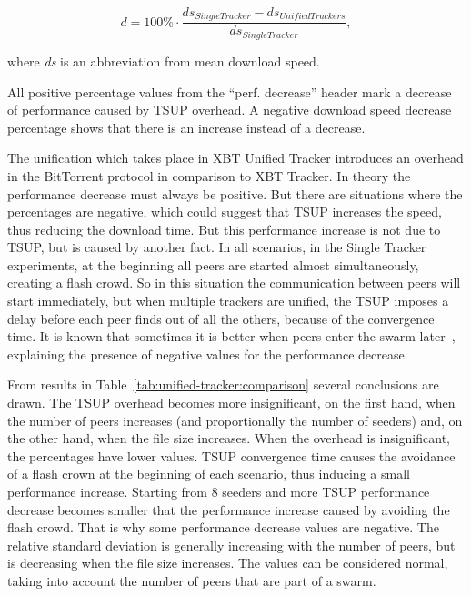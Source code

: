 
\begin{equation}\label{updates-swarmleader}
d = 100\% \cdot \frac{ds_{SingleTracker} - ds_{UnifiedTrackers}}{ds_{SingleTracker}} ,
\end{equation}


where \textit{ds} is an abbreviation from mean download speed.


All positive percentage values from the ``perf. decrease'' header mark a
decrease of performance caused by TSUP overhead. A negative download speed
decrease percentage shows that there is an increase instead of a decrease.

The unification which takes place in XBT Unified Tracker introduces an
overhead in the BitTorrent protocol in comparison to XBT Tracker. In theory
the performance decrease must always be positive. But there are situations
where the percentages are negative, which could suggest that TSUP increases
the speed, thus reducing the download time. But this performance increase is
not due to TSUP, but is caused by another fact. In all scenarios, in the
Single Tracker experiments, at the beginning all peers are started almost
simultaneously, creating a flash crowd. So in this situation the communication
between peers will start immediately, but when multiple trackers are unified,
the TSUP imposes a delay before each peer finds out of all the others, because
of the convergence time.  It is known that sometimes it is better when peers
enter the swarm later~\cite{bt-analysis}, explaining the presence of negative
values for the performance decrease.




From results in Table~\ref{tab:unified-tracker:comparison} several
conclusions are drawn.  The TSUP overhead becomes more insignificant, on the
first hand, when the number of peers increases (and proportionally the number
of seeders) and, on the other hand, when the file size increases. When the
overhead is insignificant, the percentages have lower values. TSUP convergence
time causes the avoidance of a flash crown at the beginning of each scenario,
thus inducing a small performance increase. Starting from 8 seeders and more
TSUP performance decrease becomes smaller that the performance increase caused
by avoiding the flash crowd. That is why some performance decrease values are
negative. The relative standard deviation is generally increasing with the
number of peers, but is decreasing when the file size increases. The values
can be considered normal, taking into account the number of peers that are
part of a swarm.

